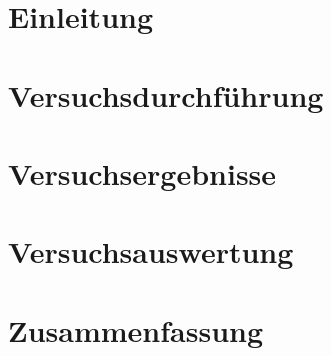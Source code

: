 % 
 


%


\pagestyle{empty}

%
\tableofcontents
%
\newpage
\pagestyle{headings}
%
\section{Einleitung}
\label{sec:Einleitung}

\clearpage
%
\section{Versuchsdurchführung}
\label{sec:Durchführung}

\clearpage
%
\section{Versuchsergebnisse}
\label{sec:Ergebnisse}

\clearpage
%
\section{Versuchsauswertung}
\label{sec:Auswertung}

\clearpage
%
\section{Zusammenfassung}
\label{sec:Zusammenfassung}

\clearpage
%

\listoftables
\newpage
%
\listoffigures
\newpage
%
%

\newpage
%

%

%
